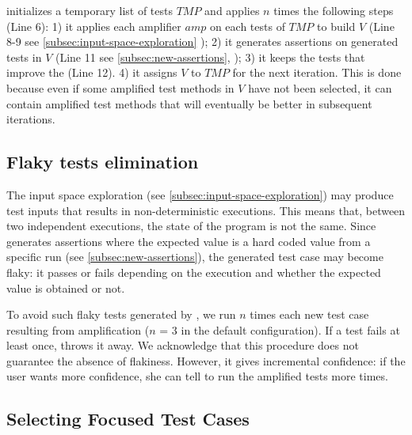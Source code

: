 \dspot initializes a temporary list of tests $TMP$ and applies $n$ times the following steps (Line 6): 
1) it applies each amplifier $amp$ on each tests of $TMP$ to build $V$ (Line 8-9 see \autoref{subsec:input-space-exploration} \ie \Iampl);
2) it generates assertions on generated tests in $V$ (Line 11 see \autoref{subsec:new-assertions}, \ie \Aampl);
3) it keeps the tests that improve the \ms (Line 12).
4) it assigns $V$ to $TMP$ for the next iteration. This is done because even if some amplified test methods in $V$ have not been selected, it can contain amplified test methods that will eventually be better in subsequent iterations.


\subsection{Flaky tests elimination}
The input space exploration (see \autoref{subsec:input-space-exploration}) may produce test inputs that results in non-deterministic executions.
This means that, between two independent executions, the state of the program is not the same.
Since \dspot generates assertions where the expected value is a hard coded value from a specific run (see \autoref{subsec:new-assertions}), the generated test case may become flaky: it passes or fails depending on the execution and whether the expected value is obtained or not.

To avoid such flaky tests generated by \dspot, we run $n$ times each new test case resulting from amplification ($n$ = 3 in the default configuration). 
If a test fails at least once, \dspot throws it away. 
We acknowledge that this procedure does not guarantee the absence of flakiness. 
However, it gives incremental confidence: if the user wants more confidence, she can tell \dspot to run the amplified tests more times.


\subsection{Selecting Focused Test Cases}
\label{subsubsec:test:cases:selection:for:pr}

